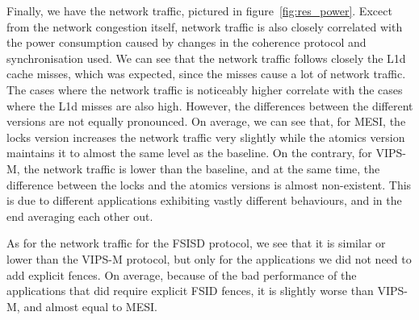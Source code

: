 Finally, we have the network traffic, pictured in figure~\ref{fig:res_power}.
Excect from the network congestion itself, network traffic is also closely
correlated with the power consumption caused by changes in the coherence
protocol and synchronisation used.  We can see that the network traffic follows
closely the L1d cache misses, which was expected, since the misses cause a lot
of network traffic. The cases where the network traffic is noticeably higher
correlate with the cases where the L1d misses are also high.  However, the
differences between the different versions are not equally pronounced. On
average, we can see that, for MESI, the locks version increases the network
traffic very slightly while the atomics version maintains it to almost the same
level as the baseline. On the contrary, for VIPS-M, the network traffic is lower
than the baseline, and at the same time, the difference between the locks and
the atomics versions is almost non-existent. This is due to different
applications exhibiting vastly different behaviours, and in the end averaging
each other out.

As for the network traffic for the FSISD protocol, we see that it is similar or
lower than the VIPS-M protocol, but only for the applications we did not need to
add explicit fences. On average, because of the bad performance of the
applications that did require explicit FSID fences, it is slightly worse than
VIPS-M, and almost equal to MESI.
